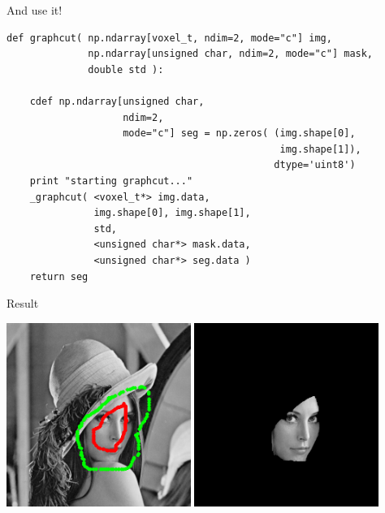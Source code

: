 \documentclass[12pt]{beamer}
\begin{document}
\begin{frame}[fragile]{And use it!}
\small
\begin{verbatim}  
def graphcut( np.ndarray[voxel_t, ndim=2, mode="c"] img,
              np.ndarray[unsigned char, ndim=2, mode="c"] mask,
              double std ):

    cdef np.ndarray[unsigned char, 
                    ndim=2, 
                    mode="c"] seg = np.zeros( (img.shape[0],
                                               img.shape[1]),
                                              dtype='uint8')
    print "starting graphcut..."                                                                 
    _graphcut( <voxel_t*> img.data,
               img.shape[0], img.shape[1],
               std,
               <unsigned char*> mask.data,
               <unsigned char*> seg.data )
    return seg
\end{verbatim}
\end{frame}

\begin{frame}{Result}

\begin{center}
\includegraphics[width=0.45\textwidth]{initialisation.png}
\hspace{0.04\textwidth}
\includegraphics[width=0.45\textwidth]{demo/graphcut2/segmentation.png}
\end{center}

\end{frame}
\end{document}
